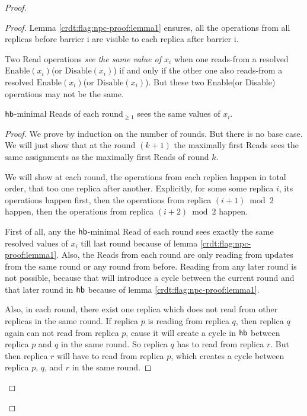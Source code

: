 \begin{proof}
\begin{proof}
Lemma \ref{crdt:flag:npc-proof:lemma1} ensures, all the operations from all replicas before barrier i are visible to each replica after barrier i.

  Two \textrm{Read} operations \emph{see the same value of $x_i$} when one reads-from a resolved $\mathrm{Enable}(x_i)$(or $\mathrm{Disable}(x_i)$) if and only if the other one also reads-from a resolved $\mathrm{Enable}(x_i)$(or $\mathrm{Disable}(x_i)$). But these two \textrm{Enable}(or \textrm{Disable}) operations may not be the same.

  \begin{lemma}
    \label{crdt:flag:npc-proof:lemma2}
    $\textsf{hb}$-minimal \textrm{Read}s of each round$_{\geq1}$ sees the same values of $x_i$.
  \end{lemma}

  \begin{proof}
    We prove by induction on the number of rounds. But there is no base case. We will just show that at the round $(k+1)$ the maximally first \textrm{Read}s sees the same assignments as the maximally first \textrm{Read}s of round $k$.

    We will show at each round, the operations from each replica happen in total order, that too one replica after another. Explicitly, for some some replica $i$, its operations happen first, then the operations from replica $(i+1) \bmod 2$ happen, then the operations from replica $(i+2) \bmod 2$ happen. 

    First of all, any the $\textsf{hb}$-minimal \textrm{Read} of each round sees exactly the same resolved values of $x_i$ till last round because of lemma \ref{crdt:flag:npc-proof:lemma1}. Also, the \textrm{Read}s from each round are only reading from updates from the same round or any round from before. Reading from any later round is not possible, because that will introduce a cycle between the current round and that later round in $\textsf{hb}$ because of lemma \ref{crdt:flag:npc-proof:lemma1}.

    Also, in each round, there exist one replica which does not read from other replicas in the same round. If replica $p$ is reading from replica $q$, then replica $q$ again can not read from replica $p$, cause it will create a cycle in $\textsf{hb}$ between replica $p$ and $q$ in the same round. So replica $q$ has to read from replica $r$. But then replica $r$ will have to read from replica $p$, which creates a cycle between replica $p$, $q$, and $r$ in the same round.


\end{proof}
\end{proof}
\end{proof}
